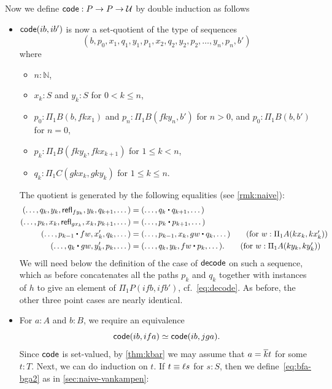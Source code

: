 %

Now we define $\mathsf{code}:P\to P\to \mathcal{U}$ by double induction as follows
\begin{itemize}
\item $\mathsf{code}(ib,ib')$ is now a set-quotient of the type of sequences
  \[ (b, p_0, x_1, q_1, y_1, p_1, x_2, q_2, y_2, p_2, \dots, y_n, p_n, b') \]
  where
  \begin{itemize}
  \item $n:\mathbb{N}$,
  \item $x_k:S$ and $y_k:S$ for $0<k \le n$,
  \item $p_0:\Pi_1B(b,f k x_1)$ and $p_n:\Pi_1B(f k y_n, b')$ for $n>0$, and $p_0:\Pi_1B(b,b')$ for $n=0$,
  \item $p_k:\Pi_1B(fk y_k, fkx_{k+1})$ for $1\le k < n$,
  \item $q_k:\Pi_1C(gkx_k, gky_k)$ for $1\le k\le n$.
  \end{itemize}
  The quotient is generated by the following equalities (see \cref{rmk:naive}):
  \begin{align*}
    (\dots, q_k, y_k, \refl{fy_k}, y_k, q_{k+1},\dots)
    &= (\dots, q_k\ct q_{k+1},\dots)\\
    (\dots, p_k, x_k, \refl{gx_k}, x_k, p_{k+1},\dots)
    &= (\dots, p_k\ct p_{k+1},\dots)\\
    (\dots, p_{k-1} \ct fw, x_{k}', q_{k}, \dots) &=
    (\dots, p_{k-1}, x_{k}, gw \ct q_{k}, \dots)
    \tag{for $w:\Pi_1A(kx_{k},kx_{k}')$}\\
    (\dots, q_k \ct gw, y_k', p_k, \dots) &=
    (\dots, q_k, y_k, fw \ct p_k, \dots).
    \tag{for $w:\Pi_1A(ky_k, ky_k')$}
  \end{align*}
  We will need below the definition of the case of $\mathsf{decode}$ on such a sequence, which as before concatenates all the paths $p_k$ and $q_k$ together with instances of $h$ to give an element of $\Pi_1P(ifb,ifb')$, cf.~\eqref{eq:decode}.
  As before, the other three point cases are nearly identical.
\item For $a:A$ and $b:B$, we require an equivalence
  \begin{equation}
    \mathsf{code}(ib, ifa) \simeq \mathsf{code}(ib,jga).\label{eq:bfa-bga2}
  \end{equation}
  Since $\mathsf{code}$ is set-valued, by \cref{thm:kbar} we may assume that $a=\overline{k} t$ for some $t:T$.
  Next, we can do induction on $t$.
  If $t\equiv \ell s$ for $s:S$, then we define~\eqref{eq:bfa-bga2} as in \cref{sec:naive-vankampen}:
  \begin{align*}

\end{align*}
\end{itemize}
